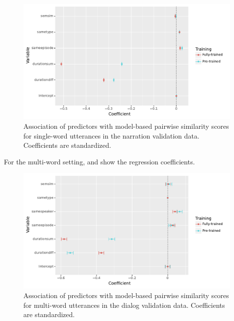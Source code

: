 \begin{figure}
  \centering
  \includegraphics[scale=0.66]{results/grsa_narration_word_coef.pdf}
  \caption{Association of predictors with 
    model-based pairwise similarity scores for single-word utterances
    in the narration validation data. Coefficients are standardized.}
  \label{fig:coef_word_narration}
\end{figure}


For the multi-word setting,  and
 show the regression coefficients.
\begin{figure}
  \centering
  \includegraphics[scale=0.66]{results/grsa_dialog_multiword_coef.pdf}
  \caption{Association of predictors with 
    model-based pairwise similarity scores for multi-word utterances
    in the dialog validation data. Coefficients are standardized.}
  \label{fig:coef_multiword_dialog}
\end{figure}

